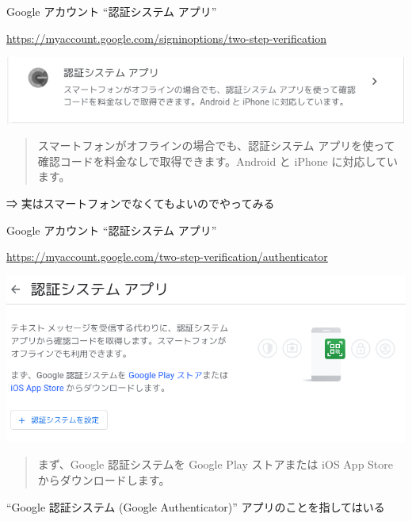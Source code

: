 \begin{frame}{Google アカウント ``認証システム アプリ''}

{\footnotesize\url{https://myaccount.google.com/signinoptions/two-step-verification}}

\begin{center}
\includegraphics[width=0.9\hsize]{image202205/g-signinopt-twostepverif-0-2.png}
\end{center}

\begin{quote}
スマートフォンがオフラインの場合でも、認証システム アプリを使って確認コードを料金なしで取得できます。Android と iPhone に対応しています。
\end{quote}

⇒ 実はスマートフォンでなくてもよいのでやってみる

\end{frame}

\begin{frame}{Google アカウント ``認証システム アプリ''}

{\footnotesize\url{https://myaccount.google.com/two-step-verification/authenticator}}

\begin{center}
\includegraphics[width=0.9\hsize]{image202205/g-twostepverif-authenticator-0.png}
\end{center}

\begin{quote}
まず、Google 認証システムを Google Play ストアまたは iOS App Store からダウンロードします。
\end{quote}

``Google 認証システム (Google Authenticator)'' アプリのことを指してはいる

\end{frame}

